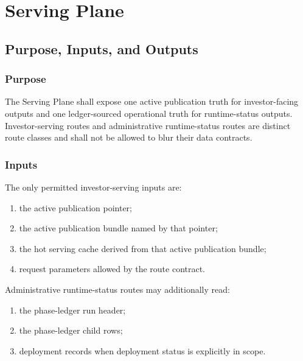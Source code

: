 \chapter{Serving Plane}
\section{Purpose, Inputs, and Outputs}

\subsection{Purpose}
The Serving Plane shall expose one active publication truth for investor-facing outputs and one ledger-sourced operational truth for runtime-status outputs. Investor-serving routes and administrative runtime-status routes are distinct route classes and shall not be allowed to blur their data contracts.

\subsection{Inputs}
The only permitted investor-serving inputs are:
\begin{enumerate}[leftmargin=1.2cm]
    \item the active publication pointer;
    \item the active publication bundle named by that pointer;
    \item the hot serving cache derived from that active publication bundle;
    \item request parameters allowed by the route contract.
\end{enumerate}

Administrative runtime-status routes may additionally read:
\begin{enumerate}[leftmargin=1.2cm]
    \item the phase-ledger run header;
    \item the phase-ledger child rows;
    \item deployment records when deployment status is explicitly in scope.
\end{enumerate}

